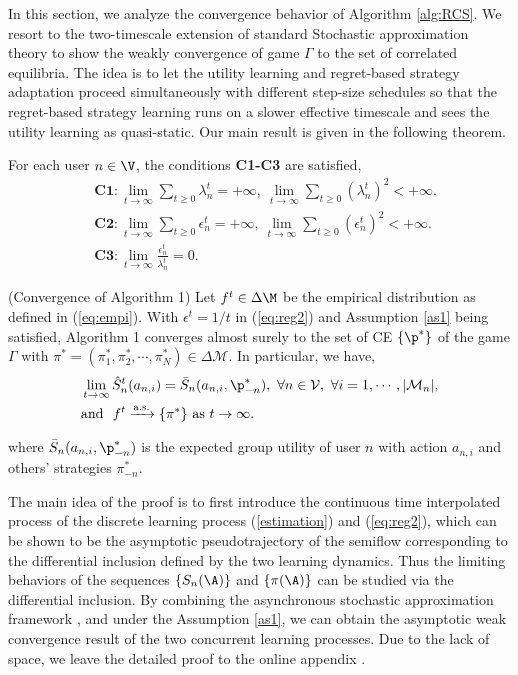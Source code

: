 In this section, we analyze the convergence behavior of Algorithm \ref{alg:RCS}. We resort to the two-timescale extension of standard Stochastic approximation theory to show the weakly convergence of game $\Gamma$ to the set of correlated equilibria. The idea is to let the utility learning and regret-based strategy adaptation proceed simultaneously with different step-size schedules so that the regret-based strategy learning runs on a slower effective timescale and sees the utility learning as quasi-static. Our main result is given in the following theorem.
\begin{as}\label{as1}
For each user $n\in\V$, the conditions \textbf{C1-C3} are satisfied,
\vspace{-0.2cm}
\begin{align}
&\textbf{C1}:\lim_{t\rightarrow\infty}\sum_{t\geq0}\lambda^t_n=+\infty,~\lim_{t\rightarrow\infty}\sum_{t\geq0}(\lambda^t_n)^2<+\infty.\\
&\textbf{C2}:\lim_{t\rightarrow\infty}\sum_{t\geq0}\epsilon^t_n=+\infty,~\lim_{t\rightarrow\infty}\sum_{t\geq0}(\epsilon^t_n)^2<+\infty.\\
&\textbf{C3}:\lim_{t\rightarrow\infty}\frac{\epsilon^t_n}{\lambda^t_n}=0.
\end{align}
\end{as}
\vspace{-0.3cm}
\begin{thm}(Convergence of Algorithm 1)
Let $f^t\in\Delta\M$ be the empirical distribution as defined in (\ref{eq:empi}). With $\epsilon^t=1/t$ in (\ref{eq:reg2}) and Assumption \ref{as1} being satisfied, Algorithm 1 converges almost surely to the set of CE $\{\p^*\}$ of the game $\Gamma$ with $\pi^*=(\pi^*_1,\pi^*_2,\cdots,\pi^*_N)\in\Delta\mathcal{M}$. In particular, we have,
\begin{align}\label{sne}
&\lim_{t\rightarrow\infty}\hat{S}^t_n(a_{n,i})=\bar{S}_n(a_{n,i},\p^*_{-n}),~\forall n\in\mathcal{V},~\forall i=1,\cdots,|\mathcal{M}_n|,\\
&\mbox{and}~~f^t\xrightarrow[\text{}]{\text{a.s.}}\{\pi^*\}~\mbox{as}~t\rightarrow\infty.
\end{align}
where $\bar{S}_n(a_{n,i},\p^*_{-n})$ is the expected group utility of user $n$ with action $a_{n,i}$ and others' strategies $\pi^*_{-n}$.
\end{thm}

The main idea of the proof is to first introduce the continuous time interpolated process of the discrete learning process (\ref{estimation}) and (\ref{eq:reg2}), which can be shown to be the asymptotic pseudotrajectory of the semiflow corresponding to the differential inclusion defined by the two learning dynamics\cite{Yin}. Thus the limiting behaviors of the sequences $\{S_n(\A)\}$ and $\{\pi(\A)\}$ can be studied via the differential inclusion. By combining the asynchronous stochastic approximation framework \cite{Borkar1997}, and under the Assumption \ref{as1}, we can obtain the asymptotic weak convergence result of the two concurrent learning processes. Due to the lack of space, we leave the detailed proof to the online appendix \cite{MY18}.

